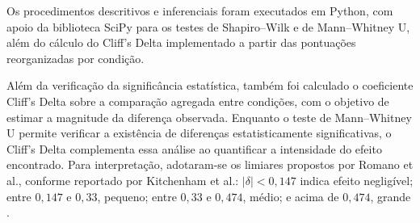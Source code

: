 Os procedimentos descritivos e inferenciais foram executados em Python, com apoio da biblioteca SciPy para os testes de Shapiro--Wilk e de Mann--Whitney U, além do cálculo do Cliff's Delta implementado a partir das pontuações reorganizadas por condição.

Além da verificação da significância estatística, também foi calculado o coeficiente Cliff's Delta sobre a comparação agregada entre condições, com o objetivo de estimar a magnitude da diferença observada. Enquanto o teste de Mann--Whitney U permite verificar a existência de diferenças estatisticamente significativas, o Cliff's Delta complementa essa análise ao quantificar a intensidade do efeito encontrado. Para interpretação, adotaram-se os limiares propostos por Romano et al., conforme reportado por Kitchenham et al.: $| \delta | < 0{,}147$ indica efeito negligível; entre $0{,}147$ e $0{,}33$, pequeno; entre $0{,}33$ e $0{,}474$, médio; e acima de $0{,}474$, grande \cite{kitchenham2019statistical}.
